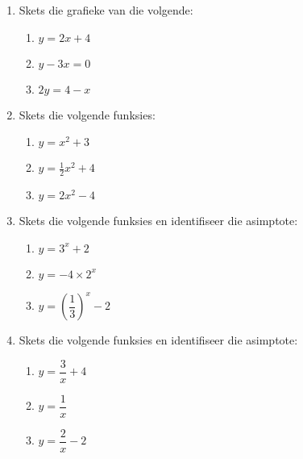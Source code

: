 \begin{eocexercises}{}
  \begin{enumerate}[itemsep=9pt, label=\textbf{\arabic*}. ] 
\item Skets die grafieke van die volgende: 
\begin{multicols}{3}
    \begin{enumerate}[noitemsep, label=\textbf{(\alph*)} ]
    \item $y=2x+4$ 
    \item $y-3x=0$ 
    \item $2y=4-x$
    \end{enumerate}
\end{multicols}
\item Skets die volgende funksies: 
\begin{multicols}{3}
    \begin{enumerate}[noitemsep, label=\textbf{(\alph*)} ] %
    \item $y=x^{2}+3$ 
    \item $y=\frac{1}{2}x^{2}+4$
    \item $y=2x^{2}-4$
    \end{enumerate}
\end{multicols}
  \item Skets die volgende funksies en identifiseer die asimptote:
\begin{multicols}{3}
    \begin{enumerate}[noitemsep, label=\textbf{(\alph*)} ]  %
    \item $y=3^{x}+2$ 
    \item $y=-4 \times 2^{x}$ 
    \item $y=\left(\dfrac{1}{3}\right)^{x}-2$ 
    \end{enumerate}
\end{multicols}
 \item Skets die volgende funksies en identifiseer die asimptote: 
\begin{multicols}{3}
    \begin{enumerate}[noitemsep, label=\textbf{(\alph*)} ] %
    \item $y=\dfrac{3}{x}+4$ 
    \item $y=\dfrac{1}{x}$ 
    \item $y=\dfrac{2}{x}-2$ 

\end{enumerate}
\end{multicols}
\end{enumerate}
\end{eocexercises}
